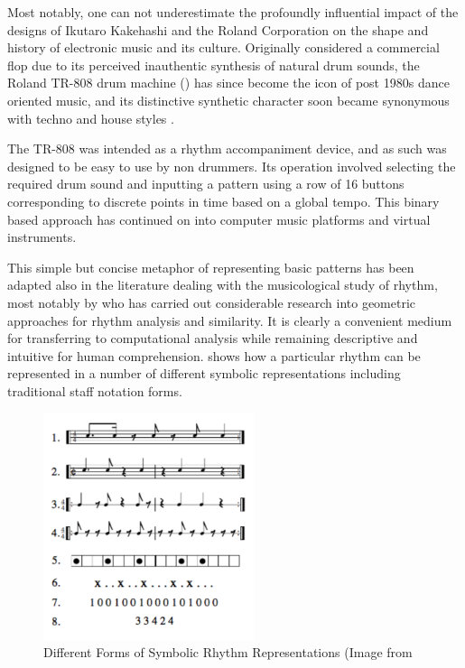 Most notably, one can not underestimate the profoundly influential impact of the designs of Ikutaro Kakehashi and the Roland Corporation on the shape and history of electronic music and its culture. Originally considered a commercial flop due to its perceived inauthentic synthesis of natural drum sounds, the Roland TR-808 drum machine () has since become the icon of post 1980s dance oriented music, and its distinctive synthetic character soon became synonymous with techno and house styles \citep{theberge1997any}.

The TR-808 was intended as a rhythm accompaniment device, and as such was designed to be easy to use by non drummers. Its operation involved selecting the required drum sound and inputting a pattern using a row of 16 buttons corresponding to discrete points in time based on a global tempo. This binary based approach has continued on into computer music platforms and virtual instruments. 


This simple but concise metaphor of representing basic patterns has been adapted also in the literature dealing with the musicological study of rhythm, most notably by \cite{Toussaint2013} who has carried out considerable research into geometric approaches for rhythm analysis and similarity. It is clearly a convenient medium for transferring to computational analysis while remaining descriptive and intuitive for human comprehension.   shows how a particular rhythm can be represented in a number of different symbolic representations including traditional staff notation forms.

\begin{figure}
	\begin{center}
		\includegraphics[width=0.55\textwidth]{ch03_symbolic/figures/reps.png}
	\end{center}
	\caption[Different Forms of Symbolic Rhythm Representations]{Different Forms of Symbolic Rhythm Representations (Image from \citep{Toussaint2003}}
	\label{fig:reps}
\end{figure}


